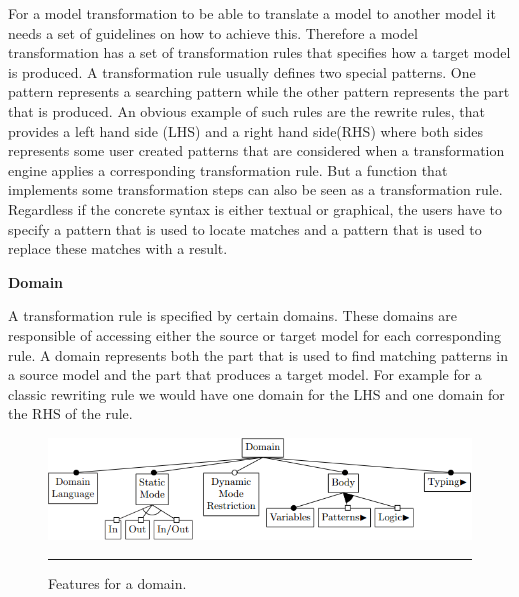 For a model transformation to be able to translate a model to another model it
needs a set of guidelines on how to achieve this. Therefore a model
transformation has a set of transformation rules that specifies how a target
model is produced. A transformation rule usually defines two special patterns.
One pattern represents a searching pattern while the other pattern represents
the part that is produced.  An obvious example of such rules are the rewrite
rules, that provides a left hand side (LHS) and a right hand side(RHS) where
both sides represents some user created patterns that are considered when a
transformation engine applies a corresponding transformation rule. But a
function that implements some transformation steps can also be seen as a
transformation rule. Regardless if the concrete syntax is either textual or
graphical, the users have to specify a pattern that is used to locate matches
and a pattern that is used to replace these matches with a result.

\textbf{Domain}

A transformation rule is specified by certain domains. These domains are
responsible of accessing either the source or target model for each
corresponding rule. A domain represents both the part that is used to find
matching patterns in a source model and the part that produces a target model.
For example for a classic rewriting rule we would have one domain for the LHS
and one domain for the RHS of the rule. 

\begin{figure}[H]
  \centering
    \includegraphics[scale=0.65]{./Figures/Domain_1.png}
    \rule{35em}{0.5pt}
  \caption[Feature diagram a domain]
  {Features for a domain.}
  \label{fig:Domain}
\end{figure}

